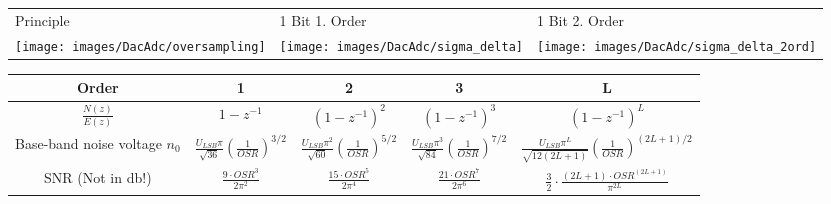 \begin{tabular}{m{6cm} m{5cm} m{5cm}}
 	Principle & 1 Bit 1. Order & 1 Bit 2. Order \\ 
	\texttt{[image: images/DacAdc/oversampling]} & 
	\texttt{[image: images/DacAdc/sigma\_delta]} &
	\texttt{[image: images/DacAdc/sigma\_delta\_2ord]} \\ 
\end{tabular}

\begin{tabular}{|c|c|c|c|c|}
\hline Order & 1 & 2 & 3 & L \\ 
\hline $\frac{N(z)}{E(z)}$ & $1-z^{-1}$ & $(1-z^{-1})^2$ & $(1-z^{-1})^3$ & $(1-z^{-1})^L$ \\ 
\hline Base-band noise voltage $n_0$ & $\frac{U_{LSB} \pi}{\sqrt{36}} \left( \frac{1}{OSR} \right)^{3/2} $ & $\frac{U_{LSB} \pi^2}{\sqrt{60}} \left( \frac{1}{OSR} \right)^{5/2}$ & $\frac{U_{LSB} \pi^3}{\sqrt{84}} \left( \frac{1}{OSR} \right)^{7/2} $ & $\frac{U_{LSB} \pi^L}{\sqrt{12(2L+1)}} \left( \frac{1}{OSR} \right)^{(2L+1)/2}$ \\ 
\hline SNR (Not in db!) & $\frac{9 \cdot OSR^3}{2\pi^2}$ & $\frac{15 \cdot OSR^5}{2\pi^4}$ & $\frac{21 \cdot OSR^7 }{2\pi^6}$ & $\frac{3}{2} \cdot \frac{(2L+1) \cdot OSR^{(2L+1)}}{\pi^{2L}}$  \\ 
\hline 
\end{tabular} 